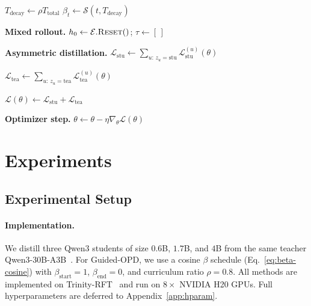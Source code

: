 \documentclass[11pt]{article}
\begin{document}
\begin{algorithm}[t]
\small
\DontPrintSemicolon
\caption{Guided-OPD step}
\label{alg:guided-opd}


$T_{\mathrm{decay}} \leftarrow \rho T_{\mathrm{total}}$\;
$\beta_t \leftarrow \mathcal{S}(t,T_{\mathrm{decay}})$

\BlankLine
\textbf{Mixed rollout.}\;
$h_0 \leftarrow \mathcal{E}.\textsc{Reset}()$;
$\tau \leftarrow [\,]$\;


\BlankLine
\textbf{Asymmetric distillation.}\;
$\mathcal{L}_{\mathrm{stu}}
\leftarrow
\sum_{u:\,z_u=\mathrm{stu}}
\mathcal{L}_{\mathrm{stu}}^{(u)}(\theta)$\;

$\mathcal{L}_{\mathrm{tea}}
\leftarrow
\sum_{u:\,z_u=\mathrm{tea}}
\mathcal{L}_{\mathrm{tea}}^{(u)}(\theta)$\;

$\mathcal{L}(\theta)
\leftarrow
\mathcal{L}_{\mathrm{stu}}+\mathcal{L}_{\mathrm{tea}}$

\BlankLine
\textbf{Optimizer step.}\;
$\theta \leftarrow \theta - \eta \nabla_\theta \mathcal{L}(\theta)$\;

\end{algorithm}

\section{Experiments}
\label{sec:exp}

\subsection{Experimental Setup}
\label{sec:exp:setup}

\paragraph{Implementation.}
We distill three Qwen3 students of size $0.6$B, $1.7$B, and $4$B from the same teacher Qwen3-30B-A3B~\citep{qwen2025qwen3}. For Guided-OPD, we use a cosine $\beta$ schedule (Eq.~\ref{eq:beta-cosine}) with $\beta_{\text{start}}=1$, $\beta_{\text{end}}=0$, and curriculum ratio $\rho=0.8$. All methods are implemented on Trinity-RFT~\citep{pan2025trinity} and run on $8\times$ NVIDIA H20 GPUs. Full hyperparameters are deferred to Appendix~\ref{app:hparam}.
\end{document}
